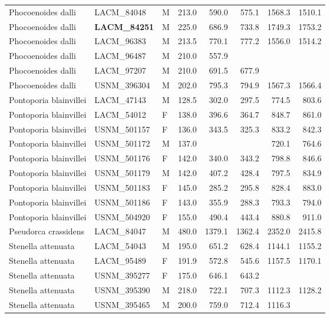 \begin{table}[ht]
\begin{tabular}{lllrrrrr}
  Phocoenoides dalli & LACM\_84048 & M & 213.0 & 590.0 & 575.1 & 1568.3 & 1510.1 \\ 
  Phocoenoides dalli & \textbf{ LACM\_84251 } & M & 225.0 & 686.9 & 733.8 & 1749.3 & 1753.2 \\ 
  Phocoenoides dalli & LACM\_96383 & M & 213.5 & 770.1 & 777.2 & 1556.0 & 1514.2 \\ 
  Phocoenoides dalli & LACM\_96487 & M & 210.0 & 557.9 &  &  &  \\ 
  Phocoenoides dalli & LACM\_97207 & M & 210.0 & 691.5 & 677.9 &  &  \\ 
  Phocoenoides dalli & USNM\_396304 & M & 202.0 & 795.3 & 794.9 & 1567.3 & 1566.4 \\ 
  Pontoporia blainvillei & LACM\_47143 & M & 128.5 & 302.0 & 297.5 & 774.5 & 803.6 \\ 
  Pontoporia blainvillei & LACM\_54012 & F & 138.0 & 396.6 & 364.7 & 848.7 & 861.0 \\ 
  Pontoporia blainvillei & USNM\_501157 & F & 136.0 & 343.5 & 325.3 & 833.2 & 842.3 \\ 
  Pontoporia blainvillei & USNM\_501172 & M & 137.0 &  &  & 720.1 & 764.6 \\ 
  Pontoporia blainvillei & USNM\_501176 & F & 142.0 & 340.0 & 343.2 & 798.8 & 846.6 \\ 
  Pontoporia blainvillei & USNM\_501179 & M & 142.0 & 407.2 & 428.4 & 797.5 & 834.9 \\ 
  Pontoporia blainvillei & USNM\_501183 & F & 145.0 & 285.2 & 295.8 & 828.4 & 883.0 \\ 
  Pontoporia blainvillei & USNM\_501186 & F & 143.0 & 355.9 & 288.3 & 793.3 & 794.0 \\ 
  Pontoporia blainvillei & USNM\_504920 & F & 155.0 & 490.4 & 443.4 & 880.8 & 911.0 \\ 
  Pseudorca crassidens & LACM\_84047 & M & 480.0 & 1379.1 & 1362.4 & 2352.0 & 2415.8 \\ 
  Stenella attenuata & LACM\_54043 & M & 195.0 & 651.2 & 628.4 & 1144.1 & 1155.2 \\ 
  Stenella attenuata & LACM\_95489 & F & 191.9 & 572.8 & 545.6 & 1157.5 & 1170.1 \\ 
  Stenella attenuata & USNM\_395277 & F & 175.0 & 646.1 & 643.2 &  &  \\ 
  Stenella attenuata & USNM\_395390 & M & 218.0 & 722.1 & 707.3 & 1112.3 & 1128.2 \\ 
  Stenella attenuata & USNM\_395465 & M & 200.0 & 759.0 & 712.4 & 1116.3 &  \\ 

\end{tabular}
\end{table}
